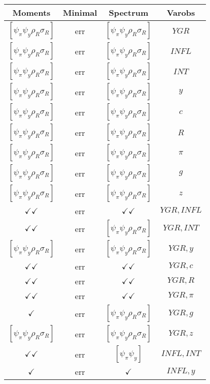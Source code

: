\documentclass[a4paper,10pt]{article}
\begin{document}
\centering
\begin{longtable}{|c|c|c|c|}
\hline
Moments & Minimal & Spectrum & Varobs \\
\hline
$[\psi_\pi \psi_y \rho_R \sigma_R ]$ & err & $[\psi_\pi \psi_y \rho_R \sigma_R ]$ & ${YGR}$ \\
\hline
$[\psi_\pi \psi_y \rho_R \sigma_R ]$ & err & $[\psi_\pi \psi_y \rho_R \sigma_R ]$ & ${INFL}$ \\
\hline
$[\psi_\pi \psi_y \rho_R \sigma_R ]$ & err & $[\psi_\pi \psi_y \rho_R \sigma_R ]$ & ${INT}$ \\
\hline
$[\psi_\pi \psi_y \rho_R \sigma_R ]$ & err & $[\psi_\pi \psi_y \rho_R \sigma_R ]$ & ${y}$ \\
\hline
$[\psi_\pi \psi_y \rho_R \sigma_R ]$ & err & $[\psi_\pi \psi_y \rho_R \sigma_R ]$ & ${c}$ \\
\hline
$[\psi_\pi \psi_y \rho_R \sigma_R ]$ & err & $[\psi_\pi \psi_y \rho_R \sigma_R ]$ & ${R}$ \\
\hline
$[\psi_\pi \psi_y \rho_R \sigma_R ]$ & err & $[\psi_\pi \psi_y \rho_R \sigma_R ]$ & ${\pi}$ \\
\hline
$[\psi_\pi \psi_y \rho_R \sigma_R ]$ & err & $[\psi_\pi \psi_y \rho_R \sigma_R ]$ & ${g}$ \\
\hline
$[\psi_\pi \psi_y \rho_R \sigma_R ]$ & err & $[\psi_\pi \psi_y \rho_R \sigma_R ]$ & ${z}$ \\
\hline
$\checkmark\checkmark$ & err & $\checkmark\checkmark$ & ${YGR},{INFL}$ \\
\hline
$\checkmark\checkmark$ & err & $[\psi_\pi \psi_y \rho_R \sigma_R ]$ & ${YGR},{INT}$ \\
\hline
$[\psi_\pi \psi_y \rho_R \sigma_R ]$ & err & $[\psi_\pi \psi_y \rho_R \sigma_R ]$ & ${YGR},{y}$ \\
\hline
$\checkmark\checkmark$ & err & $\checkmark\checkmark$ & ${YGR},{c}$ \\
\hline
$\checkmark\checkmark$ & err & $\checkmark\checkmark$ & ${YGR},{R}$ \\
\hline
$\checkmark\checkmark$ & err & $\checkmark\checkmark$ & ${YGR},{\pi}$ \\
\hline
$\checkmark$ & err & $[\psi_\pi \psi_y \rho_R \sigma_R ]$ & ${YGR},{g}$ \\
\hline
$[\psi_\pi \psi_y \rho_R \sigma_R ]$ & err & $[\psi_\pi \psi_y \rho_R \sigma_R ]$ & ${YGR},{z}$ \\
\hline
$\checkmark\checkmark$ & err & $[\psi_\pi \psi_y ]$ & ${INFL},{INT}$ \\
\hline
$\checkmark$ & err & $\checkmark$ & ${INFL},{y}$ \\

\end{longtable}
\end{document}
